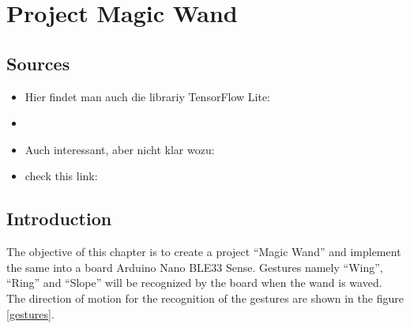 %
%
%



\chapter{Project Magic Wand}

\section{Sources}




\begin{itemize}
    \item Hier findet man auch die librariy TensorFlow Lite: 
    \item {}
    \item Auch interessant, aber nicht klar wozu:
    \item check this link: 
\end{itemize}




\section{Introduction} 


The objective of this chapter is to create a project ``Magic Wand'' and implement the same into a board Arduino Nano BLE33 Sense. Gestures namely ``Wing'', ``Ring'' and ``Slope'' will be recognized by the board when the wand is waved. The direction of motion for the recognition of the gestures are shown in the figure \ref{gestures}.

